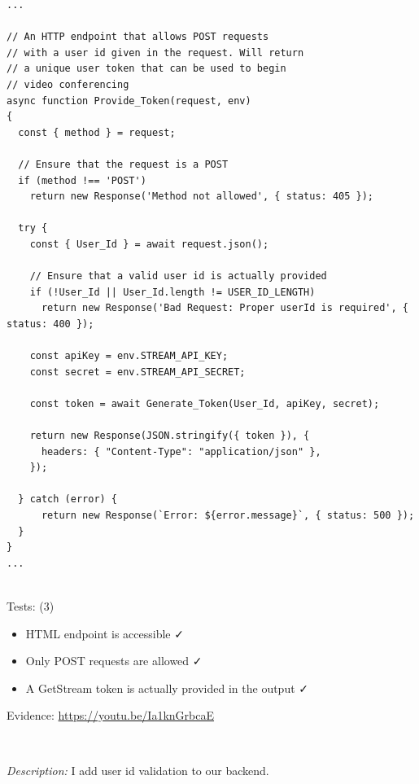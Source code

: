 \begin{verbatim}
...

// An HTTP endpoint that allows POST requests
// with a user id given in the request. Will return
// a unique user token that can be used to begin
// video conferencing
async function Provide_Token(request, env)
{
  const { method } = request;

  // Ensure that the request is a POST
  if (method !== 'POST')
    return new Response('Method not allowed', { status: 405 });

  try {
    const { User_Id } = await request.json();

    // Ensure that a valid user id is actually provided
    if (!User_Id || User_Id.length != USER_ID_LENGTH)
      return new Response('Bad Request: Proper userId is required', { status: 400 });

    const apiKey = env.STREAM_API_KEY;
    const secret = env.STREAM_API_SECRET;

    const token = await Generate_Token(User_Id, apiKey, secret);

    return new Response(JSON.stringify({ token }), {
      headers: { "Content-Type": "application/json" },
    });

  } catch (error) {
      return new Response(`Error: ${error.message}`, { status: 500 });
  }
}
...
\end{verbatim}

{\color{gray} \hrulefill} \\ \vspace{0.2cm}
{\sffamily Tests: (3)}

\begin{itemize}
  \item HTML endpoint is accessible \faCheck \\
  \item Only POST requests are allowed \faCheck \\
  \item A GetStream token is actually provided in the output \faCheck
\end{itemize}

{\sffamily Evidence: \url{https://youtu.be/Ia1knGrbcaE}}

{\color{gray} \hrulefill}
\\ \vspace{0.2cm}

\textit{Description:} I add user id validation to our backend.
\\ \vspace{0.2cm}

